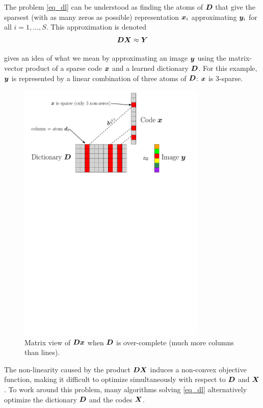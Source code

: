 The problem \eqref{eq_dl} can be understood as finding the atoms of $\bm{D}$ that give the sparsest (with as many zeros as possible) representation $\bm{x}_i$ approximating $\bm{y}_i$ for all $i = 1,\dots,S$. This approximation is denoted
$$\bm{D}\bm{X} \approx \bm{Y}$$

 gives an idea of what we mean by approximating an image $\bm{y}$ using the matrix-vector product of a sparse code $\bm{x}$ and a learned dictionary $\bm{D}$. For this example, $\bm{y}$ is represented by a linear combination of three atoms of $\bm{D}$: $\bm{x}$ is 3-sparse.

\begin{figure}[!ht] \centering
\includegraphics[width=0.80\textwidth]{figures/sparsity-matrix.pdf}
\caption{Matrix view of $\bm{D}\bm{x}$ when $\bm{D}$ is over-complete (much more columns than lines).}\label{fig_overcomplete_matrix}
\end{figure}


The non-linearity caused by the product $\bm{D}\bm{X}$ induces a non-convex objective function, making it difficult to optimize simultaneously with respect to $\bm{D}$ and $\bm{X}$. To work around this problem, many algorithms solving \eqref{eq_dl} alternatively optimize the dictionary $\bm{D}$ and the codes $\bm{X}$.

